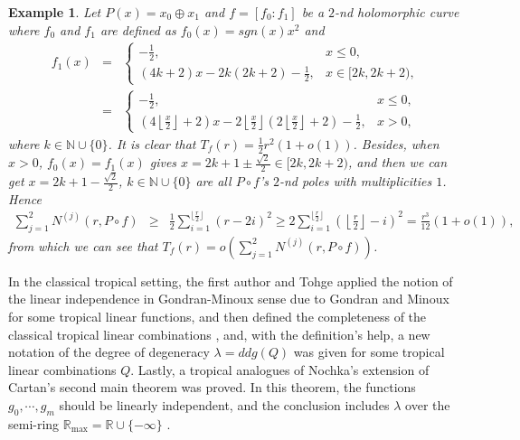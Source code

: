 \documentclass{article}
\newtheorem{exa}[defin]{Example}
\begin{document}
\begin{exa}
    Let $P(x)=x_{0}\oplus x_{1}$ and $f=[f_{0}: f_{1}]$ be a $2$-nd holomorphic curve where $f_{0}$ and $f_{1}$ are defined as $f_{0}(x)=sgn(x)x^{2}$ and
    \begin{eqnarray*}
         f_{1}(x)&=&\left\{\begin{array}{ll}
         -\frac{1}{2}, & x\leq 0,\\
         (4k+2)x-2k(2k+2)-\frac{1}{2}, & x\in[2k, 2k+2),
         \end{array}\right.\\
         &=&\left\{\begin{array}{ll}
         -\frac{1}{2}, & x\leq 0,\\
         (4\left\lfloor \frac{x}{2}\right\rfloor+2)x-2\left\lfloor \frac{x}{2}\right\rfloor(2\left\lfloor \frac{x}{2}\right\rfloor+2)-\frac{1}{2}, & x>0,
         \end{array}\right.
    \end{eqnarray*}
    where $k\in\mathbb{N}\cup\{0\}$. It is clear that $T_{f}(r)=\frac{1}{2}r^{2}(1+o(1))$. Besides, when $x>0$, $f_{0}(x)=f_{1}(x)$ gives $x=2k+1\pm\frac{\sqrt{2}}{2}\in[2k, 2k+2)$, and then we can get $x=2k+1-\frac{\sqrt{2}}{2}$, $k\in\mathbb{N}\cup\{0\}$ are all $P\circ f$'s $2$-nd poles with multiplicities $1$. Hence
    \begin{eqnarray*}
        \sum_{j=1}^{2}N^{(j)}(r, P\circ f)&\geq&\frac{1}{2}\sum_{i=1}^{\lfloor\frac{r}{2}\rfloor}(r-2i)^{2}\geq 2\sum_{i=1}^{\lfloor\frac{r}{2}\rfloor}\left(\left\lfloor\frac{r}{2}\right\rfloor-i\right)^{2}=\frac{r^{3}}{12}(1+o(1)),
    \end{eqnarray*}
    from which we can see that $T_{f}(r)=o\left(\sum_{j=1}^{2}N^{(j)}(r, P\circ f)\right)$.
\end{exa}

In the classical tropical setting, the first author and Tohge applied the notion of the linear independence in Gondran-Minoux sense due to Gondran and Minoux \cite{Gon1, Gon2} for some tropical linear functions, and then defined the completeness of the classical tropical linear combinations \cite{Pro}, and, with the definition's help, a new notation of the degree of degeneracy $\lambda=ddg(Q)$ was given for some tropical linear combinations $Q$. Lastly, a tropical analogues of Nochka's extension of Cartan's second main theorem was proved. In this theorem, the functions $g_{0}, \cdots, g_{m}$ should be linearly independent, and the conclusion includes $\lambda$ over the semi-ring $\mathbb{R}_{\max}=\mathbb{R}\cup \{-\infty\}$ \cite[Theorem 6.6]{Pro}. 
\end{document}
